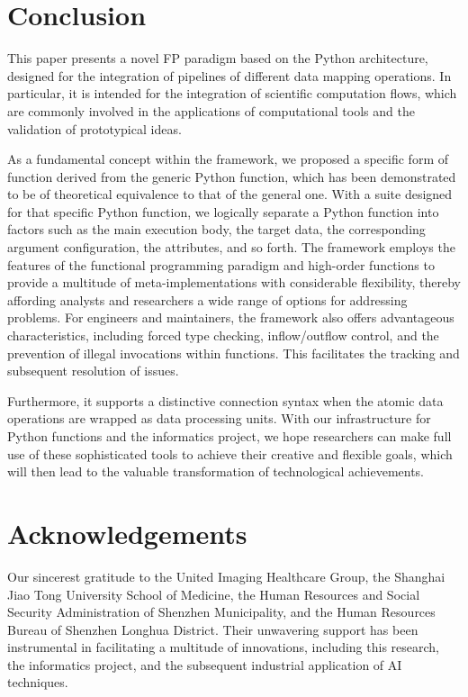\documentclass[a4paper,12pt]{article}
\begin{document}
\section*{Conclusion}

This paper presents a novel FP paradigm based on the Python architecture, designed for the integration of pipelines of different data mapping operations. In particular, it is intended for the integration of scientific computation flows, which are commonly involved in the applications of computational tools and the validation of prototypical ideas.\par

As a fundamental concept within the framework, we proposed a specific form of function derived from the generic Python function, which has been demonstrated to be of theoretical equivalence to that of the general one. With a suite designed for that specific Python function, we logically separate a Python function into factors such as the main execution body, the target data, the corresponding argument configuration, the attributes, and so forth. The framework employs the features of the functional programming paradigm and high-order functions to provide a multitude of meta-implementations with considerable flexibility, thereby affording analysts and researchers a wide range of options for addressing problems. For engineers and maintainers, the framework also offers advantageous characteristics, including forced type checking, inflow/outflow control, and the prevention of illegal invocations within functions. This facilitates the tracking and subsequent resolution of issues.\par

Furthermore, it supports a distinctive connection syntax when the atomic data operations are wrapped as data processing units. With our infrastructure for Python functions and the informatics project, we hope researchers can make full use of these sophisticated tools to achieve their creative and flexible goals, which will then lead to the valuable transformation of technological achievements.\par

\section*{Acknowledgements}

Our sincerest gratitude to the United Imaging Healthcare Group, the Shanghai Jiao Tong University School of Medicine, the Human Resources and Social Security Administration of Shenzhen Municipality, and the Human Resources Bureau of Shenzhen Longhua District. Their unwavering support has been instrumental in facilitating a multitude of innovations, including this research, the informatics project, and the subsequent industrial application of AI techniques.\par
\end{document}
